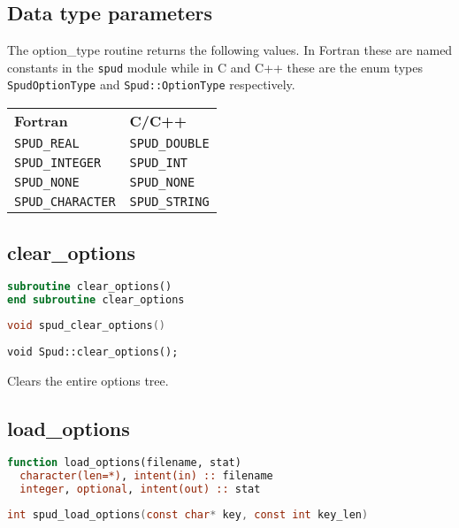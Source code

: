 \documentclass[a4paper, 11pt]{book}
\begin{document}
\subsection{Data type parameters}\label{sec:types}

The option\_type routine returns the following values. In Fortran these are
named constants in the \lstinline+spud+ module while in C and C++ these are
the enum types \lstinline+SpudOptionType+ and \lstinline+Spud::OptionType+
respectively.

\begin{tabular}{ll}
  \textbf{Fortran} & \textbf{C/C++} \\
  \lstinline+SPUD_REAL+ & \lstinline+SPUD_DOUBLE+\\
  \lstinline+SPUD_INTEGER+ & \lstinline+SPUD_INT+\\
  \lstinline+SPUD_NONE+ & \lstinline+SPUD_NONE+\\
  \lstinline+SPUD_CHARACTER+ & \lstinline+SPUD_STRING+
\end{tabular}

\subsection{clear\_options}

\begin{lstlisting}[language=fortran]
subroutine clear_options()
end subroutine clear_options
\end{lstlisting}

\begin{lstlisting}[language=C]
void spud_clear_options()
\end{lstlisting}

\begin{lstlisting}
void Spud::clear_options();
\end{lstlisting}

Clears the entire options tree.

\subsection{load\_options}

\begin{lstlisting}[language=fortran]
function load_options(filename, stat)
  character(len=*), intent(in) :: filename
  integer, optional, intent(out) :: stat
\end{lstlisting}

\begin{lstlisting}[language=C]
int spud_load_options(const char* key, const int key_len)
\end{lstlisting}
\end{document}
